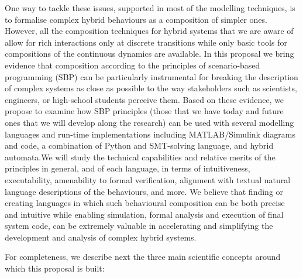 \documentclass[11pt]{article}
\begin{document}
One way to tackle these issues, supported in most of the modelling techniques, is to formalise complex hybrid behaviours as a composition of simpler ones. However, all the composition techniques for hybrid systems that we are aware of allow for rich interactions only at discrete transitions while only basic tools for compositions of the continuous dynamics are available. In this proposal we bring evidence that composition according to the principles of scenario-based programming (SBP) can be particularly instrumental for breaking the description of complex systems as close as possible to the way stakeholders such as scientists, engineers, or high-school students perceive them. Based on these evidence, we propose to examine how SBP principles (those that we have today and future ones that we will develop along the research) can be used with several modelling languages and run-time implementations including MATLAB/Simulink diagrams and code, a combination of Python and SMT-solving language, and hybrid automata.We will study the technical capabilities and relative merits of the principles in general, and of each language, in terms of intuitiveness, executability, amenability to formal verification, alignment with textual natural language descriptions of the behaviours, and more. We believe that finding or creating languages in which such behavioural composition can be both precise and intuitive while enabling simulation, formal analysis and execution of final system code, can be extremely valuable in accelerating and simplifying the development and analysis of complex hybrid systems.


For completeness, we describe next the three  main scientific concepts around which this proposal is built:
\end{document}
